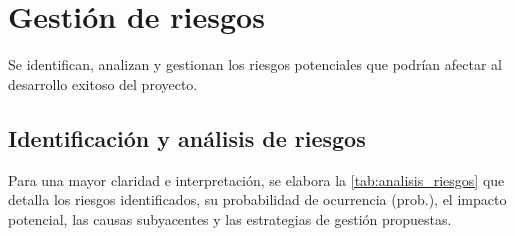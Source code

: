 \documentclass[12pt,a4paper,onecolumn,oneside]{report}
\begin{document}
\section{Gestión de riesgos}
\label{sec:Gestión de riesgos}

Se identifican, analizan y gestionan los riesgos potenciales que podrían afectar al desarrollo exitoso del proyecto.

\subsection{Identificación y análisis de riesgos}
\label{Identificación y análisis de riesgos}

Para una mayor claridad e interpretación, se elabora la \autoref{tab:analisis_riesgos} que detalla los riesgos identificados, su probabilidad de ocurrencia (prob.), el impacto potencial, 
las causas subyacentes y las estrategias de gestión propuestas.

\end{document}
